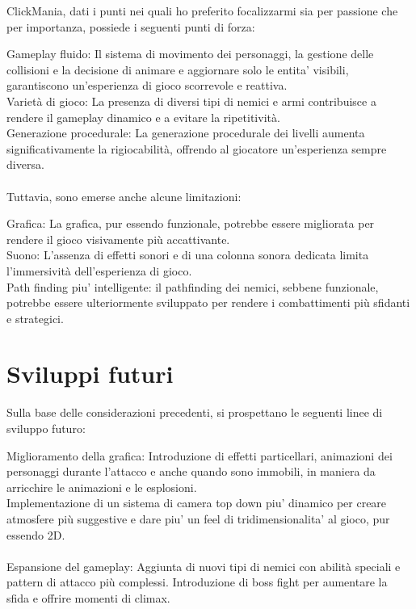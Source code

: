 \documentclass[12pt,a4paper]{report}
\begin{document}
ClickMania, dati i punti nei quali ho preferito focalizzarmi sia per passione che per importanza, possiede i seguenti punti di forza:


Gameplay fluido: Il sistema di movimento dei personaggi, la gestione delle collisioni e la decisione di animare e aggiornare solo
le entita' visibili, garantiscono un'esperienza di gioco scorrevole e reattiva.\\
Varietà di gioco: La presenza di diversi tipi di nemici e armi contribuisce a rendere il gameplay dinamico e a evitare la ripetitività.\\
Generazione procedurale: La generazione procedurale dei livelli aumenta significativamente la rigiocabilità,
offrendo al giocatore un'esperienza sempre diversa.\\\\

Tuttavia, sono emerse anche alcune limitazioni:

Grafica: La grafica, pur essendo funzionale, potrebbe essere migliorata per rendere il gioco visivamente più accattivante.\\
Suono: L'assenza di effetti sonori e di una colonna sonora dedicata limita l'immersività dell'esperienza di gioco.\\
Path finding piu' intelligente: il pathfinding dei nemici, sebbene funzionale, potrebbe essere ulteriormente sviluppato
per rendere i combattimenti più sfidanti e strategici.\\

\section{Sviluppi futuri}\label{ch:arch}
Sulla base delle considerazioni precedenti, si prospettano le seguenti linee di sviluppo futuro:

Miglioramento della grafica:
Introduzione di effetti particellari, animazioni dei personaggi durante l'attacco e anche quando sono immobili, in maniera 
da arricchire le animazioni e le esplosioni.\\

Implementazione di un sistema di camera top down piu' dinamico per creare atmosfere più suggestive e dare piu' un feel 
di tridimensionalita' al gioco, pur essendo 2D.\\\\

Espansione del gameplay:
Aggiunta di nuovi tipi di nemici con abilità speciali e pattern di attacco più complessi.
Introduzione di boss fight per aumentare la sfida e offrire momenti di climax.\\
\end{document}

